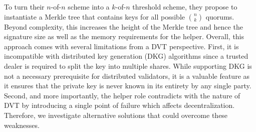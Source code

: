 To turn their $n$-of-$n$ scheme into a $k$-of-$n$ threshold scheme, they propose to instantiate a Merkle tree that contains keys for all possible $\binom{n}{k}$ quorums.
Beyond complexity, this increases the height of the Merkle tree and hence the signature size as well as the memory requirements for the helper.
Overall, this approach comes with several limitations from a DVT perspective.
First, it is incompatible with distributed key generation (DKG) algorithms since a trusted dealer is required to split the key into multiple shares.
While supporting DKG is not a necessary prerequisite for distributed validators, it is a valuable feature as it ensures that the private key is never known in its entirety by any single party.
Second, and more importantly, the helper role contradicts with the nature of DVT by introducing a single point of failure which affects decentralization.
Therefore, we investigate alternative solutions that could overcome these weaknesses.



